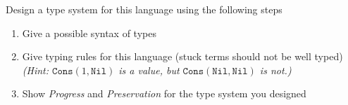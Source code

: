 \begin{minipage}{\textwidth}
  \begin{minipage}{0.45\textwidth}
    \begin{prooftree}
    \end{prooftree}
  \end{minipage}
  \hfill
  \begin{minipage}{0.45\textwidth}
    \begin{prooftree}
    \end{prooftree}
  \end{minipage}
  \begin{minipage}{0.3\textwidth}
    \begin{prooftree}
    \end{prooftree}
  \end{minipage}
  \hfill
  \begin{minipage}{0.3\textwidth}
    \begin{prooftree}
    \end{prooftree}
  \end{minipage}
  \hfill
  \begin{minipage}{0.3\textwidth}
    \begin{prooftree}
    \end{prooftree}
  \end{minipage}
  \hfill
  \vspace{1em}
\end{minipage}
Design a type system for this language using the following steps
\begin{enumerate}
  \item Give a possible syntax of types
  \item Give typing rules for this language (stuck terms should not be well typed)\\
    \emph{(Hint: $\mathtt{Cons}(1,\mathtt{Nil})$ is a value, but $\mathtt{Cons}(\mathtt{Nil},\mathtt{Nil})$ is not.)}
  \item Show \emph{Progress} and \emph{Preservation} for the type system you designed
\end{enumerate}

